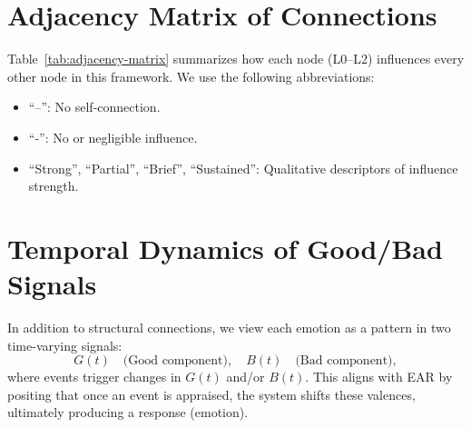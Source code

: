 \documentclass[11pt]{article}
\begin{document}
\section{Adjacency Matrix of Connections}
\label{sec:matrix}
Table~\ref{tab:adjacency-matrix} summarizes how each node (L0--L2) influences every other node in this framework. We use the following abbreviations:

\begin{itemize}
    \item “--”: No self-connection.
    \item “-”: No or negligible influence.
    \item “Strong”, “Partial”, “Brief”, “Sustained”: Qualitative descriptors of influence strength.
\end{itemize}

\begin{table}[htbp]
\centering
\renewcommand{\arraystretch}{1.15}
\caption{Adjacency matrix for L0--L2 nodes. Each cell indicates the qualitative nature of influence. The diagonal is ``--'' to denote no self-connections.}
\label{tab:adjacency-matrix}
\end{table}

\section{Temporal Dynamics of Good/Bad Signals}
\label{sec:dynamics}
In addition to structural connections, we view each emotion as a pattern in two time-varying signals:
\[
G(t) \quad\text{(Good component)}, 
\quad 
B(t) \quad\text{(Bad component)},
\]
where events trigger changes in \(G(t)\) and/or \(B(t)\). This aligns with EAR by positing that once an event is appraised, the system shifts these valences, ultimately producing a response (emotion).
\end{document}
